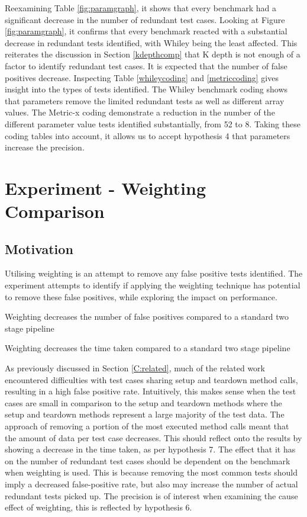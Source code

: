 Reexamining Table \ref{fig:paramgraph}, it shows that every benchmark had a significant decrease in the number of redundant test cases. Looking at Figure \ref{fig:paramgraph}, it confirms that every benchmark reacted with a substantial decrease in redundant tests identified, with Whiley being the least affected. This reiterates the discussion in Section \ref{kdepthcomp} that K depth is not enough of a factor to identify redundant test cases. It is expected that the number of false positives decrease. Inspecting Table \ref{whileycoding} and \ref{metriccoding} gives insight into the types of tests identified. The Whiley benchmark coding shows that parameters remove the limited redundant tests as well as different array values. The Metric-x coding demonstrate a reduction in the number of the different parameter value tests identified substantially, from 52 to 8. Taking these coding tables into account, it allows us to accept hypothesis 4 that parameters increase the precision.

\section{Experiment  - Weighting Comparison}
\label{sec:weight}

\subsection{Motivation}
Utilising weighting is an attempt to remove any false positive tests identified. The experiment attempts to identify if applying the weighting technique has potential to remove these false positives, while exploring the impact on performance.

\begin{hyp}
Weighting decreases the number of false positives compared to a standard two stage pipeline
\end{hyp}

\begin{hyp}
Weighting decreases the time taken compared to a standard two stage pipeline
\end{hyp}

As previously discussed in Section \ref{C:related}, much of the related work encountered difficulties with test cases sharing setup and teardown method calls, resulting in a high false positive rate. Intuitively, this makes sense when the test cases are small in comparison to the setup and teardown methods where the setup and teardown methods represent a large majority of the test data. The approach of removing a portion of the most executed method calls meant that the amount of data per test case decreases. This should reflect onto the results by showing a decrease in the time taken, as per hypothesis 7. The effect that it has on the number of redundant test cases should be dependent on the benchmark when weighting is used. This is because removing the most common tests should imply a decreased false-positive rate, but also may increase the number of actual redundant tests picked up. The precision is of interest when examining the cause effect of weighting, this is reflected by hypothesis 6.

